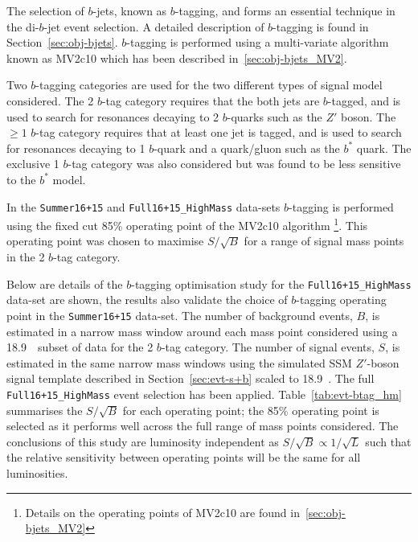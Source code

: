 The selection of $b$-jets, known as $b$-tagging,
and forms an essential technique in the di-$b$-jet event selection.
A detailed description of $b$-tagging is found in Section~\ref{sec:obj-bjets}.
$b$-tagging is performed using a multi-variate algorithm known as MV2c10 which has been described in~\ref{sec:obj-bjets_MV2}.

Two $b$-tagging categories are used for the two different types of signal model considered.
The 2 $b$-tag category requires that the both jets are $b$-tagged,
and is used to search for resonances decaying to 2 $b$-quarks such as the $Z'$ boson.
The $\geq 1$ $b$-tag category requires that at least one jet is tagged,
and is used to search for resonances decaying to 1 $b$-quark and a quark/gluon such as the $b^*$ quark.
The exclusive 1 $b$-tag category was also considered but was found to be less sensitive to the $b^*$ model.

In the \verb|Summer16+15| and \verb|Full16+15_HighMass| data-sets
$b$-tagging is performed using the fixed cut 85\% operating point of the MV2c10 algorithm
\footnote{Details on the operating points of MV2c10 are found in~\ref{sec:obj-bjets_MV2}}.
This operating point was chosen to maximise $S/\sqrt{B}$ for a range of signal mass points in the 2 $b$-tag category.

Below are details of the $b$-tagging optimisation study for the \verb|Full16+15_HighMass| data-set are shown,
the results also validate the choice of $b$-tagging operating point in the \verb|Summer16+15| data-set.
The number of background events, $B$, is estimated in
a narrow mass window around
each mass point considered using a
18.9~\ifb~subset of data for the 2 $b$-tag category.
The number of signal events, $S$, is estimated
in the same narrow mass windows using 
the simulated SSM $Z'$-boson signal template
described in Section~\ref{sec:evt-s+b} scaled to 18.9~\ifb.
The full \verb|Full16+15_HighMass| event selection has been applied.
Table~\ref{tab:evt-btag_hm} summarises the $S/\sqrt{B}$ for each operating point;
the 85\% operating point is selected as it performs well across the full range of mass points considered.
The conclusions of this study are luminosity independent
as $S/\sqrt{B} \propto 1/\sqrt{L}$ such that the relative sensitivity
between operating points will be the same for all luminosities.

